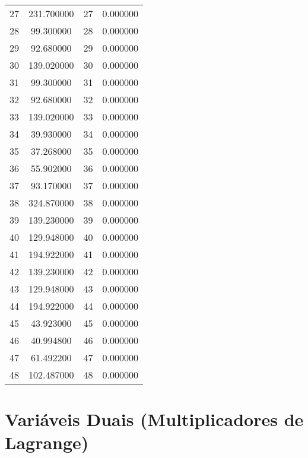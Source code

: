 \documentclass[12pt]{article}
\begin{document}
\begin{longtable}{@{}cccc@{}}
27 & 231.700000 & 27 & 0.000000 \\
28 & 99.300000 & 28 & 0.000000 \\
29 & 92.680000 & 29 & 0.000000 \\
30 & 139.020000 & 30 & 0.000000 \\
31 & 99.300000 & 31 & 0.000000 \\
32 & 92.680000 & 32 & 0.000000 \\
33 & 139.020000 & 33 & 0.000000 \\
34 & 39.930000 & 34 & 0.000000 \\
35 & 37.268000 & 35 & 0.000000 \\
36 & 55.902000 & 36 & 0.000000 \\
37 & 93.170000 & 37 & 0.000000 \\
38 & 324.870000 & 38 & 0.000000 \\
39 & 139.230000 & 39 & 0.000000 \\
40 & 129.948000 & 40 & 0.000000 \\
41 & 194.922000 & 41 & 0.000000 \\
42 & 139.230000 & 42 & 0.000000 \\
43 & 129.948000 & 43 & 0.000000 \\
44 & 194.922000 & 44 & 0.000000 \\
45 & 43.923000 & 45 & 0.000000 \\
46 & 40.994800 & 46 & 0.000000 \\
47 & 61.492200 & 47 & 0.000000 \\
48 & 102.487000 & 48 & 0.000000 \\

\end{longtable}

\section{Variáveis Duais (Multiplicadores de Lagrange)}
\end{document}

